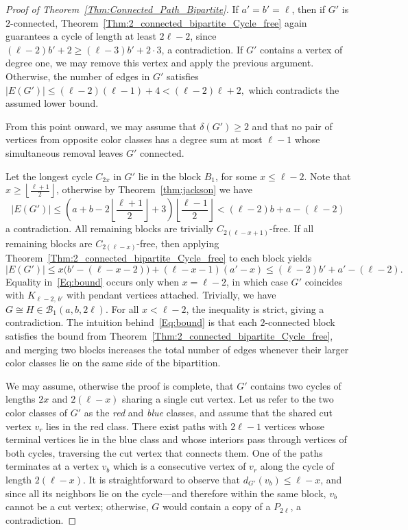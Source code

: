 \documentclass[11pt,a4paper]{article}
\newcommand{\B}{\mathcal{B}}
\newcommand{\floor}[1]{\left\lfloor{#1}\right\rfloor}
\begin{document}
\begin{proof}[Proof of Theorem~\ref{Thm:Connected_Path_Bipartite}]
If $a' = b' = \ell$, then if $G'$ is $2$-connected, Theorem~\ref{Thm:2_connected_bipartite_Cycle_free} again guarantees a cycle of length at least $2\ell - 2$, since $(\ell - 2)b' + 2 \ge (\ell - 3)b' + 2 \cdot 3$, a contradiction. 
If $G'$ contains a vertex of degree one, we may remove this vertex and apply the previous argument. 
Otherwise, the number of edges in $G'$ satisfies $|E(G')| \le (\ell - 2)(\ell - 1) + 4 < (\ell - 2)\ell + 2,$ which contradicts the assumed lower bound.


From this point onward, we may assume that $\delta(G') \ge 2$ and that no pair of vertices from opposite color classes has a degree sum at most $\ell - 1$ whose simultaneous removal leaves $G'$ connected.


Let the longest cycle $C_{2x}$ in $G'$ lie in the block $B_1$, for some $x \le \ell - 2$.  
Note that $x\geq \floor{\frac{\ell+1}{2}}$, otherwise by Theorem~\ref{thm:jackson} we have
\[|E(G')|\leq \left(a+b- 2\floor{\frac{\ell+1}{2}}+3\right)\floor{\frac{\ell-1}{2}} <(\ell-2)b+a-(\ell-2)\]
a contradiction.
All remaining blocks are trivially $C_{2(\ell - x + 1)}$-free.  If all remaining blocks are $C_{2(\ell - x)}$-free, then applying Theorem~\ref{Thm:2_connected_bipartite_Cycle_free} to each block yields
\begin{equation}\label{Eq:bound}
|E(G')|\leq x\bigl(b' - (\ell - x - 2)\bigr) + (\ell - x - 1)(a' - x) 
   \le (\ell - 2)b' + a' - (\ell - 2).
\end{equation}
Equality in~\eqref{Eq:bound} occurs only when $x = \ell - 2$, in which case $G'$ coincides with $K_{\ell - 2,\, b'}$ with pendant vertices attached.  Trivially, we have $G \cong  H\in \B_1(a,b,2\ell)$.
For all $x < \ell - 2$, the inequality is strict, giving a contradiction.
The intuition behind~\eqref{Eq:bound} is that each $2$-connected block satisfies the bound from Theorem~\ref{Thm:2_connected_bipartite_Cycle_free}, and merging two blocks increases the total number of edges whenever their larger color classes lie on the same side of the bipartition.  

We may assume, otherwise the proof is complete, that $G'$ contains two cycles of lengths $2x$ and $2(\ell - x)$ sharing a single cut vertex. 
Let us refer to the two color classes of $G'$ as the \emph{red} and \emph{blue} classes, and assume that the shared cut vertex  $v_r$ lies in the red class.  
There exist paths with $2\ell - 1$ vertices whose terminal vertices lie in the blue class and whose interiors pass through vertices of both cycles, traversing the cut vertex that connects them.
One of the paths terminates at a vertex $v_b$ which is a consecutive vertex of $v_r$ along the cycle of length $2(\ell - x)$. 
It is straightforward to observe that $d_{G'}(v_b) \le \ell - x$, and since all its neighbors lie on the cycle—and therefore within the same block, $v_b$ cannot be a cut vertex; otherwise, $G$ would contain a copy of a $P_{2\ell}$, a contradiction.



\end{proof}
\end{document}
